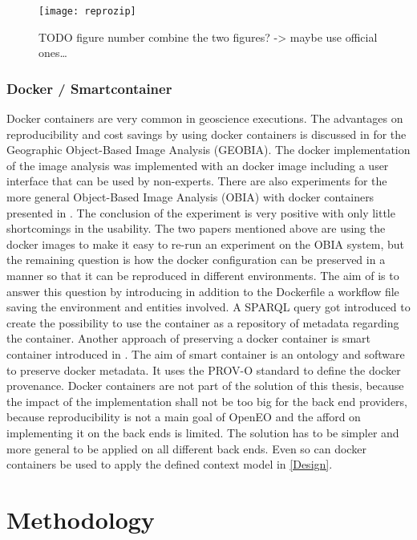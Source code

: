 \documentclass[draft,final]{vutinfth} %
\begin{document}
\begin{figure}[h]
	\centering
	\texttt{[image: reprozip]}
	\caption{TODO figure number combine the two figures? -> maybe use official ones… }
	\label{fig:reprozip} %
\end{figure}

\subsection{Docker / Smartcontainer}\label{Smartcontainer}
Docker containers are very common in geoscience executions. The advantages on reproducibility and cost savings by using docker containers is discussed in \cite{rs9030290} for the Geographic Object-Based Image Analysis (GEOBIA). The docker implementation of the image analysis was implemented with an docker image including a user interface that can be used by non-experts. There are also experiments for the more general Object-Based Image Analysis (OBIA) with docker containers presented in \cite{proceedings456}. The conclusion of the experiment is very positive with only little shortcomings in the usability. The two papers mentioned above are using the docker images to make it easy to re-run an experiment on the OBIA system, but the remaining question is how the docker configuration can be preserved in a manner so that it can be reproduced in different environments. The aim of \cite{emsley2017a} is to answer this question by introducing in addition to the Dockerfile a workflow file saving the environment and entities involved. A SPARQL query got introduced to create the possibility to use the container as a repository of metadata regarding the container. 
Another approach of preserving a docker container is smart container introduced in \cite{Huo2015SmartCA}. The aim of smart container is an ontology and software to preserve docker metadata. It uses the PROV-O standard to define the docker provenance. 
Docker containers are not part of the solution of this thesis, because the impact of the implementation shall not be too big for the back end providers, because reproducibility is not a main goal of OpenEO and the afford on implementing it on the back ends is limited. The solution has to be simpler and more general to be applied on all different back ends. Even so can docker containers be used to apply the defined context model in \ref{Design}.

\chapter{Methodology}\label{Methodology}
\end{document}
